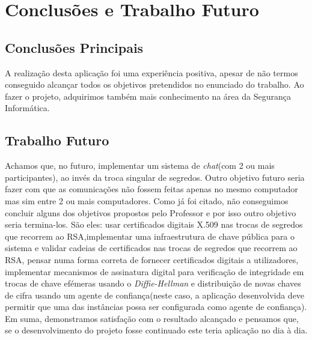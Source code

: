 \chapter{Conclusões e Trabalho Futuro}
\label{chap:conc-trab-futuro}

\section{Conclusões Principais}
\label{sec:conc-princ}

A realização desta aplicação foi uma experiência positiva, apesar de não termos conseguido alcançar todos os objetivos pretendidos no enunciado do trabalho. Ao fazer o projeto, adquirimos também mais conhecimento na área da Segurança Informática. 

\section{Trabalho Futuro}
\label{sec:trab-futuro}

Achamos que, no futuro, implementar um sistema de \emph{chat}(com 2 ou mais participantes), ao invés da troca singular de segredos.
\newline Outro objetivo futuro seria fazer com que as comunicações não fossem feitas apenas no mesmo computador mas sim entre 2 ou mais computadores.
\newline Como já foi citado, não conseguimos concluir alguns dos objetivos propostos pelo Professor e por isso outro objetivo seria termina-los. São eles: usar certificados digitais X.509 nas trocas de segredos que recorrem ao RSA,implementar uma infraestrutura de chave pública para o sistema e validar cadeias de certificados nas trocas de segredos que recorrem ao RSA, pensar numa forma correta de fornecer certificados digitais a utilizadores, implementar mecanismos de assinatura digital para verificação de integridade em trocas de chave efémeras usando o \textit{Diffie-Hellman} e distribuição de novas chaves de cifra usando um agente de confiança(neste caso, a aplicação desenvolvida deve permitir que uma das instâncias possa ser configurada como agente de confiança).
\newline Em suma, demonstramos satisfação com o resultado alcançado e pensamos que, se o desenvolvimento do projeto fosse continuado este teria aplicação no dia à dia.




